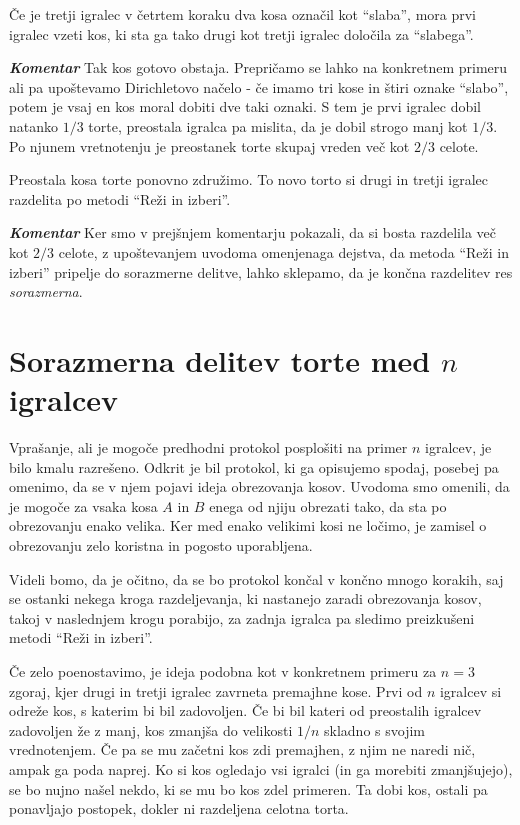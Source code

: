 \documentclass[a4paper,12pt]{article}
\begin{document}
\begin{protokol}
\item Če je tretji igralec v četrtem koraku dva kosa označil kot ``slaba'', mora prvi igralec vzeti kos, ki sta ga tako drugi kot tretji igralec določila za ``slabega''.

\item [\textbf{\em Komentar}]Tak kos gotovo obstaja. Prepričamo se lahko na konkretnem primeru ali pa upoštevamo Dirichletovo načelo - če imamo tri kose in štiri oznake ``slabo'', potem je vsaj en kos moral dobiti dve taki oznaki. S tem je prvi igralec dobil natanko $1/3$ torte, preostala igralca pa mislita, da je dobil strogo manj kot $1/3$. Po njunem vretnotenju je preostanek torte skupaj vreden več kot $2/3$ celote.

\item Preostala kosa torte ponovno združimo. To novo torto si drugi in tretji igralec razdelita po metodi ``Reži in izberi''.

\item [\textbf{\em Komentar}] Ker smo v prejšnjem komentarju pokazali, da si bosta razdelila več kot $2/3$ celote, z upoštevanjem uvodoma omenjenaga dejstva, da metoda ``Reži in izberi'' pripelje do sorazmerne delitve, lahko sklepamo, da je končna razdelitev res  {\em sorazmerna}.

\end{protokol}

\section{Sorazmerna delitev torte med $n$ igralcev}

Vprašanje, ali je mogoče predhodni protokol posplošiti na primer $n$ igralcev, je bilo kmalu razrešeno. Odkrit je bil protokol, ki ga opisujemo spodaj, posebej pa omenimo, da se v njem pojavi ideja obrezovanja kosov. Uvodoma smo omenili, da je mogoče za vsaka kosa $A$ in $B$ enega od njiju obrezati tako, da sta po obrezovanju enako velika. Ker med enako velikimi kosi ne ločimo, je zamisel o obrezovanju zelo koristna in pogosto uporabljena. 

Videli bomo, da je očitno, da se bo protokol končal v končno mnogo korakih, saj se ostanki nekega kroga razdeljevanja, ki nastanejo zaradi obrezovanja kosov, takoj v naslednjem krogu porabijo, za zadnja igralca pa sledimo preizkušeni metodi ``Reži in izberi''. 

Če zelo poenostavimo, je ideja podobna kot v konkretnem primeru za $n = 3$ zgoraj, kjer drugi in tretji igralec zavrneta premajhne kose. Prvi od $n$ igralcev si odreže kos, s katerim bi bil zadovoljen. Če bi bil kateri od preostalih igralcev zadovoljen že z manj, kos zmanjša do velikosti $1/n$ skladno s svojim vrednotenjem. Če pa se mu začetni kos zdi premajhen, z njim ne naredi nič, ampak ga poda naprej. Ko si kos ogledajo vsi igralci (in ga morebiti zmanjšujejo), se bo nujno našel nekdo, ki se mu bo kos zdel primeren. Ta dobi kos, ostali pa ponavljajo postopek, dokler ni razdeljena celotna torta.
\end{document}

